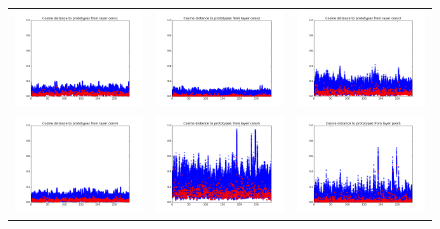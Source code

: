 \begin{figure}[htb]
\centering
\begin{tabular}{ccc}
    \includegraphics[width=0.33\linewidth]{images/classification/distances/all_classes_full_train/cos_distances_conv1}&
    \includegraphics[width=0.33\linewidth]{images/classification/distances/all_classes_full_train/cos_distances_conv2}&
    \includegraphics[width=0.33\linewidth]{images/classification/distances/all_classes_full_train/cos_distances_conv3} \\
    \includegraphics[width=0.33\linewidth]{images/classification/distances/all_classes_full_train/cos_distances_conv4}&
    \includegraphics[width=0.33\linewidth]{images/classification/distances/all_classes_full_train/cos_distances_conv5}&
    \includegraphics[width=0.33\linewidth]{images/classification/distances/all_classes_full_train/cos_distances_pool5} \\

\end{tabular}
\end{figure}
